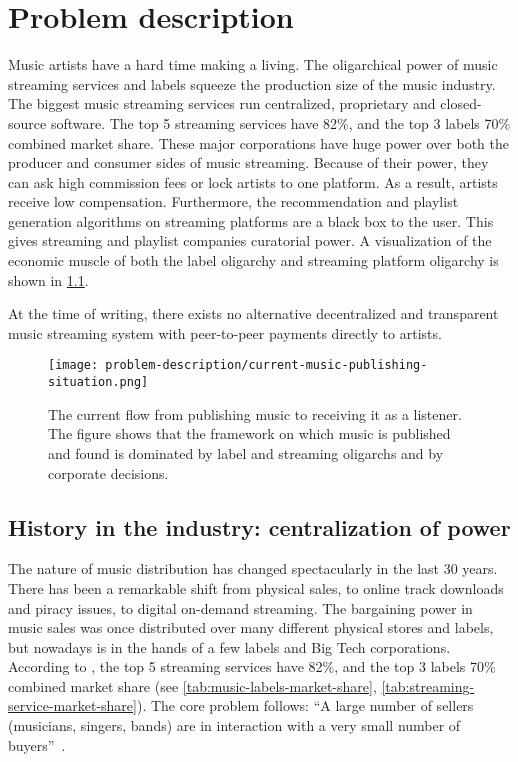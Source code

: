 \chapter{\label{chap:related-work}Problem description}
Music artists have a hard time making a living. The oligarchical power of music streaming services and labels squeeze the production size of the music industry. The biggest music streaming services run centralized, proprietary and closed-source software. The top 5 streaming services have 82\%, and the top 3 labels 70\% combined market share. These major corporations have huge power over both the producer and consumer sides of music streaming. Because of their power, they can ask high commission fees or lock artists to one platform. As a result, artists receive low compensation. Furthermore, the recommendation and playlist generation algorithms on streaming platforms are a black box to the user. This gives streaming and playlist companies curatorial power. A visualization of the economic muscle of both the label oligarchy and streaming platform oligarchy is shown in \ref{fig:current-music-publishing-situation}.

At the time of writing, there exists no alternative decentralized and transparent music streaming system with peer-to-peer payments directly to artists. 

\begin{figure}
    \centering
    \texttt{[image: problem-description/current-music-publishing-situation.png]}
    \caption{The current flow from publishing music to receiving it as a listener. The figure shows that the framework on which music is published and found is dominated by label and streaming oligarchs and by corporate decisions.}
    \label{fig:current-music-publishing-situation}
\end{figure}

\section{History in the industry: centralization of power}
The nature of %
music distribution has changed spectacularly in the last 30 years. There has been a remarkable shift from physical sales, to online track downloads and piracy issues, to digital on-demand streaming. The bargaining power in music sales was once distributed over many different physical stores and labels, but nowadays is in the hands of a few labels and Big Tech corporations. According to \cite{midiamarketshare2020}, the top 5 streaming services have 82\%, and the top 3 labels 70\% combined market share (see \ref{tab:music-labels-market-share}, \ref{tab:streaming-service-market-share}). The core problem follows: ``A large number of sellers (musicians, singers, bands) are in interaction with a very small number of buyers''~\citep{rayna2009monometapoly}.

